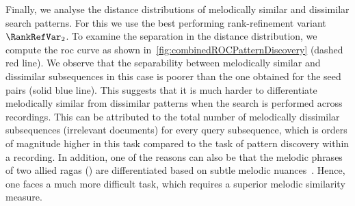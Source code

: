 Finally, we analyse the distance distributions of melodically similar and dissimilar search patterns. For this we use the best performing rank-refinement variant $\RankRefVar_2$. To examine the separation in the distance distribution, we compute the \acrshort{roc} curve as shown in~\ref{fig:combinedROCPatternDiscovery} (dashed red line). We observe that the separability between melodically similar and dissimilar subsequences in this case is poorer than the one obtained for the seed pairs (solid blue line). This suggests that it is much harder to differentiate melodically similar from dissimilar patterns when the search is performed across recordings. This can be attributed to the total number of melodically dissimilar subsequences (irrelevant documents) for every query subsequence, which is orders of magnitude higher in this task compared to the task of pattern discovery within a recording. In addition, one of the reasons can also be that the melodic phrases of two allied \glspl{raga} () are differentiated based on subtle melodic nuances~\citep{Viswanathan2004}. Hence, one faces a much more difficult task, which requires a superior melodic similarity measure.%

